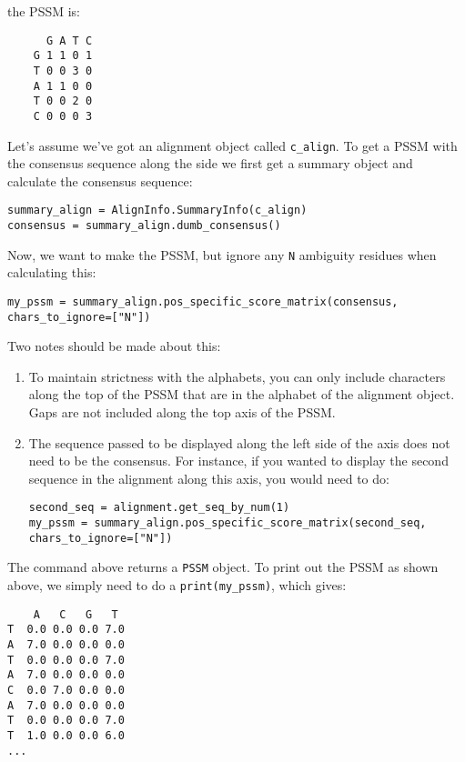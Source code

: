\noindent the PSSM is:

\begin{verbatim}
      G A T C
    G 1 1 0 1
    T 0 0 3 0
    A 1 1 0 0
    T 0 0 2 0
    C 0 0 0 3
\end{verbatim}

Let's assume we've got an alignment object called \verb|c_align|. To get a PSSM with the consensus sequence along the side we first get a summary object and calculate the consensus sequence:

\begin{verbatim}
summary_align = AlignInfo.SummaryInfo(c_align)
consensus = summary_align.dumb_consensus()
\end{verbatim}

Now, we want to make the PSSM, but ignore any \verb|N| ambiguity residues when calculating this:

\begin{verbatim}
my_pssm = summary_align.pos_specific_score_matrix(consensus, chars_to_ignore=["N"])
\end{verbatim}

Two notes should be made about this:

\begin{enumerate}
  \item To maintain strictness with the alphabets, you can only include characters along the top of the PSSM that are in the alphabet of the alignment object. Gaps are not included along the top axis of the PSSM.

  \item The sequence passed to be displayed along the left side of the axis does not need to be the consensus. For instance, if you wanted to display the second sequence in  the alignment along this axis, you would need to do:

\begin{verbatim}
second_seq = alignment.get_seq_by_num(1)
my_pssm = summary_align.pos_specific_score_matrix(second_seq, chars_to_ignore=["N"])
\end{verbatim}

\end{enumerate}

The command above returns a \verb|PSSM| object.
To print out the PSSM as shown above,
we simply need to do a \verb|print(my_pssm)|, which gives:

\begin{verbatim}
    A   C   G   T
T  0.0 0.0 0.0 7.0
A  7.0 0.0 0.0 0.0
T  0.0 0.0 0.0 7.0
A  7.0 0.0 0.0 0.0
C  0.0 7.0 0.0 0.0
A  7.0 0.0 0.0 0.0
T  0.0 0.0 0.0 7.0
T  1.0 0.0 0.0 6.0
...
\end{verbatim}


